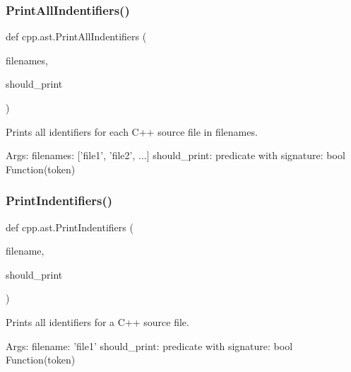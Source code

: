 \mbox{\label{namespacecpp_1_1ast_abc501124095357c1cf56eaf10e1df327}} 
\subsubsection{\texorpdfstring{Print\+All\+Indentifiers()}{PrintAllIndentifiers()}}
{\footnotesize\ttfamily def cpp.\+ast.\+Print\+All\+Indentifiers (\begin{DoxyParamCaption}\item[{}]{filenames,  }\item[{}]{should\+\_\+print }\end{DoxyParamCaption})}

\begin{DoxyVerb}Prints all identifiers for each C++ source file in filenames.

Args:
  filenames: ['file1', 'file2', ...]
  should_print: predicate with signature: bool Function(token)
\end{DoxyVerb}
 \mbox{\label{namespacecpp_1_1ast_a6a793b93aff7779af7017d001ce3b226}} 
\subsubsection{\texorpdfstring{Print\+Indentifiers()}{PrintIndentifiers()}}
{\footnotesize\ttfamily def cpp.\+ast.\+Print\+Indentifiers (\begin{DoxyParamCaption}\item[{}]{filename,  }\item[{}]{should\+\_\+print }\end{DoxyParamCaption})}

\begin{DoxyVerb}Prints all identifiers for a C++ source file.

Args:
  filename: 'file1'
  should_print: predicate with signature: bool Function(token)
\end{DoxyVerb}
 \mbox{\label{namespacecpp_1_1ast_a0b1c00fd4aaa476b10de6b3a2550f39f}} 

